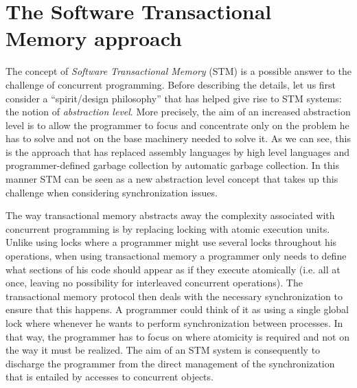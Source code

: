 
\section{The Software Transactional Memory approach}
The concept of {\it Software Transactional  Memory}   (STM)  is  a possible answer  
to   the  challenge of concurrent programming.
Before describing the details, let us first consider a ``spirit/design philosophy'' that has helped give
rise to  STM systems: the notion of 
{\it abstraction level}.
More precisely,  the  aim of an increased abstraction level is   to allow  the programmer  to  focus and
concentrate only  on the problem  he has to
solve and not on the base machinery needed to solve it. 
As we can see, this is the approach  that  has   replaced assembly languages  
by  high level languages and programmer-defined garbage collection 
by automatic garbage collection.
In this manner STM can  be seen as a  new abstraction level concept
that takes  up  this challenge when considering synchronization issues.

The way transactional memory abstracts away the  complexity associated with 
concurrent programming is   by  replacing locking  with  atomic
execution units.
Unlike using locks where a programmer might use several locks
throughout his operations, when using transactional memory
a programmer only needs to define what sections of his code should
appear as if they execute atomically (i.e. all at once, leaving
no possibility for interleaved concurrent operations).
The transactional memory protocol then deals with the necessary
synchronization to ensure that this happens.
A programmer could think of it as using a single global lock
where whenever he wants to perform synchronization between processes.
In  that way, the programmer has to focus on  where 
atomicity is required and  not on the  way it must be realized. The aim of
an STM system is consequently  to  discharge the programmer from the direct 
management  of  the  synchronization  that  is entailed  by   accesses   to
concurrent  objects.  

